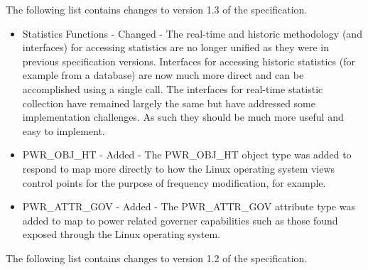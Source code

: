 The following list contains changes to version 1.3 of the specification.

\begin{itemize}
  \item{Statistics Functions - Changed - The real-time and historic methodology (and interfaces) for accessing statistics are no longer unified as they were in previous specification versions.
                                         Interfaces for accessing historic statistics (for example from a database) are now much more direct and can be accomplished using a single call. 
                                         The interfaces for real-time statistic collection have remained largely the same but have addressed some implementation challenges. 
                                         As such they should be much more useful and easy to implement. }
  \item{PWR_OBJ_HT - Added - The PWR_OBJ_HT object type was added to respond to map more directly to how the Linux operating system views control points for the purpose of frequency modification, for example.}
  \item{PWR_ATTR_GOV - Added - The PWR_ATTR_GOV attribute type was added to map to power related governer capabilities such as those found exposed through the Linux operating system. }
\end{itemize}


The following list contains changes to version 1.2 of the specification.


